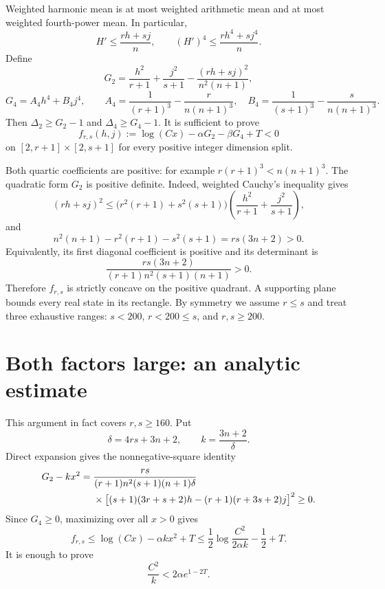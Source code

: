 \documentclass[11pt]{article}
\theoremstyle{remark}
\begin{document}
Weighted harmonic mean is at most weighted arithmetic mean and at most weighted fourth-power mean. In particular,
\[
 H'\le\frac{rh+sj}{n},\qquad (H')^4\le\frac{rh^4+sj^4}{n}.
\]
Define
\begin{equation}\label{eq:G2}
 G_2=\frac{h^2}{r+1}+\frac{j^2}{s+1}
 -\frac{(rh+sj)^2}{n^2(n+1)},
\end{equation}
\begin{equation}\label{eq:G4}
 G_4=A_4h^4+B_4j^4,\qquad
 A_4=\frac1{(r+1)^3}-\frac r{n(n+1)^3},\quad
 B_4=\frac1{(s+1)^3}-\frac s{n(n+1)^3}.
\end{equation}
Then $\Delta_2\ge G_2-1$ and $\Delta_4\ge G_4-1$. It is sufficient to prove
\begin{equation}\label{eq:f}
 f_{r,s}(h,j):=\log(Cx)-\alpha G_2-\beta G_4+T<0
\end{equation}
on $[2,r+1]\times[2,s+1]$ for every positive integer dimension split.

Both quartic coefficients are positive: for example $r(r+1)^3<n(n+1)^3$. The quadratic form $G_2$ is positive definite. Indeed, weighted Cauchy's inequality gives
\[
 (rh+sj)^2\le\bigl(r^2(r+1)+s^2(s+1)\bigr)
 \left(\frac{h^2}{r+1}+\frac{j^2}{s+1}\right),
\]
and
\[
 n^2(n+1)-r^2(r+1)-s^2(s+1)=rs(3n+2)>0.
\]
Equivalently, its first diagonal coefficient is positive and its determinant is
\begin{equation}\label{eq:det}
 \frac{rs(3n+2)}{(r+1)n^2(s+1)(n+1)}>0.
\end{equation}
Therefore $f_{r,s}$ is strictly concave on the positive quadrant. A supporting plane bounds every real state in its rectangle. By symmetry we assume $r\le s$ and treat three exhaustive ranges: $s<200$, $r<200\le s$, and $r,s\ge200$.

\section{Both factors large: an analytic estimate}\label{sec:large}

This argument in fact covers $r,s\ge160$. Put
\[
 \delta=4rs+3n+2,\qquad k=\frac{3n+2}{\delta}.
\]
Direct expansion gives the nonnegative-square identity
\begin{align}\label{eq:square}
 G_2-kx^2={}&\frac{rs}{(r+1)n^2(s+1)(n+1)\delta}\notag\\
 &\times\bigl[(s+1)(3r+s+2)h-(r+1)(r+3s+2)j\bigr]^2\ge0.
\end{align}
Since $G_4\ge0$, maximizing over all $x>0$ gives
\begin{equation}\label{eq:largemax}
 f_{r,s}\le\log(Cx)-\alpha kx^2+T
 \le\frac12\log\frac{C^2}{2\alpha k}-\frac12+T.
\end{equation}
It is enough to prove
\begin{equation}\label{eq:largetarget}
 \frac{C^2}{k}<2\alpha e^{1-2T}.
\end{equation}
\end{document}
